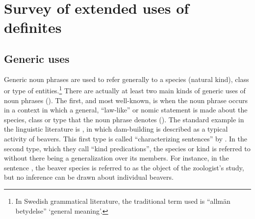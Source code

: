 \section{ Survey of extended uses of definites}
\label{bkm:Ref105226591}\subsection{ Generic uses}
\label{bkm:Ref154983693}
Generic noun phrases are used to refer generally to a species (natural kind), class or type of entities.\footnote{ In Swedish grammatical literature, the traditional term used is “allmän betydelse” ‘general meaning’.} There are actually at least two main kinds of generic uses of noun phrases (\citet[19]{KrifkaEtAl1995}). The first, and most well-known, is when the noun phrase occurs in a context in which a general, “law-like” or nomic statement is made about the species, class or type that the noun phrase denotes (\citet{Dahl1973}). The\textbf{ }standard example in the linguistic literature is , in which dam-building is described as a typical activity of beavers. This first type is called “characterizing sentences” by \citet{KrifkaEtAl1995}. In the second type, which they call “kind predications”, the species or kind is referred to without there being a generalization over its members. For instance, in the sentence , the beaver species is referred to as the object of the zoologist’s study, but no inference can be drawn about individual beavers.


